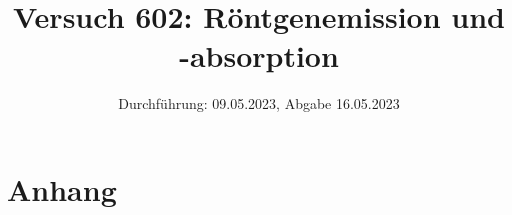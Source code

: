 

\title{Versuch 602: Röntgenemission und -absorption}
\date{Durchführung: 09.05.2023, Abgabe 16.05.2023}


\maketitle
\thispagestyle{empty} 
\tableofcontents
\newpage
\setcounter{page}{1}






\printbibliography
\newpage

\section*{Anhang}



